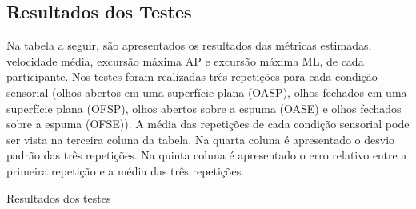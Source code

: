 
\begin{apendicesenv}

\partapendices

\chapter{Resultados dos Testes}\label{resultadostestes}

Na tabela a seguir, são apresentados os resultados das métricas estimadas, velocidade média, excursão máxima AP e  excursão máxima ML, de cada participante. Nos testes foram realizadas três repetições para cada condição sensorial (olhos abertos em uma superfície plana (OASP), olhos fechados em uma superfície plana (OFSP), olhos abertos sobre a espuma (OASE) e olhos fechados sobre a espuma (OFSE)). A média das repetições de cada condição sensorial pode ser vista na terceira coluna da tabela. Na quarta coluna é apresentado o desvio padrão das três repetições. Na quinta coluna é apresentado o erro relativo entre a primeira repetição e a média das três repetições.   
\begin{table}[ht]
\captionsetup{justification   = raggedright,
              singlelinecheck = false}
\caption{Resultados dos testes }


\end{table}
\end{apendicesenv}
